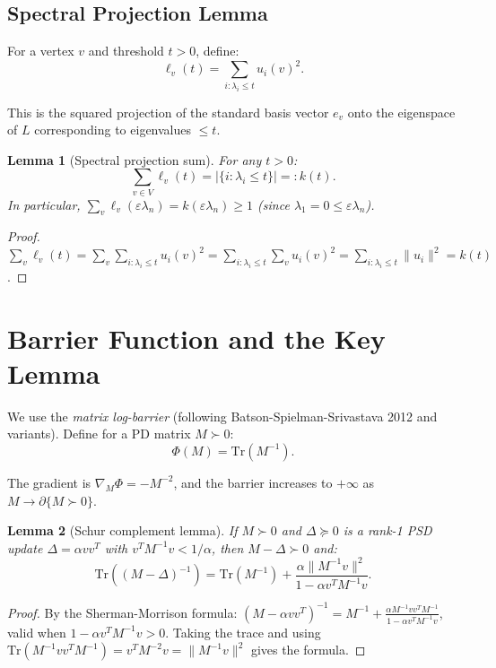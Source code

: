 \documentclass[12pt]{article}
\newtheorem{lemma}{Lemma}
\theoremstyle{definition}
\begin{document}
\subsection{Spectral Projection Lemma}

For a vertex $v$ and threshold $t > 0$, define:
$$\ell_v(t) = \sum_{i : \lambda_i \leq t} u_i(v)^2.$$

This is the squared projection of the standard basis vector $e_v$ onto the eigenspace of $L$ corresponding to eigenvalues $\leq t$.

\begin{lemma}[Spectral projection sum]\label{lem:spectral}
For any $t > 0$:
$$\sum_{v \in V} \ell_v(t) = |\{i : \lambda_i \leq t\}| =: k(t).$$
In particular, $\sum_v \ell_v(\varepsilon \lambda_n) = k(\varepsilon\lambda_n) \geq 1$ (since $\lambda_1 = 0 \leq \varepsilon\lambda_n$).
\end{lemma}

\begin{proof}
$\sum_v \ell_v(t) = \sum_v \sum_{i:\lambda_i\leq t} u_i(v)^2 = \sum_{i:\lambda_i\leq t}\sum_v u_i(v)^2 = \sum_{i:\lambda_i\leq t}\|u_i\|^2 = k(t)$.
\end{proof}

\section{Barrier Function and the Key Lemma}

We use the \emph{matrix log-barrier} (following Batson-Spielman-Srivastava 2012 and variants). Define for a PD matrix $M \succ 0$:
$$\Phi(M) = \mathrm{Tr}(M^{-1}).$$

The gradient is $\nabla_M \Phi = -M^{-2}$, and the barrier increases to $+\infty$ as $M \to \partial\{M \succ 0\}$.

\begin{lemma}[Schur complement lemma]\label{lem:schur}
If $M \succ 0$ and $\Delta \succeq 0$ is a rank-1 PSD update $\Delta = \alpha vv^T$ with $v^T M^{-1} v < 1/\alpha$, then $M - \Delta \succ 0$ and:
$$\mathrm{Tr}((M-\Delta)^{-1}) = \mathrm{Tr}(M^{-1}) + \frac{\alpha \|M^{-1}v\|^2}{1 - \alpha v^T M^{-1}v}.$$
\end{lemma}

\begin{proof}
By the Sherman-Morrison formula: $(M - \alpha vv^T)^{-1} = M^{-1} + \frac{\alpha M^{-1}vv^T M^{-1}}{1 - \alpha v^T M^{-1}v}$, valid when $1 - \alpha v^T M^{-1}v > 0$. Taking the trace and using $\mathrm{Tr}(M^{-1}vv^TM^{-1}) = v^TM^{-2}v = \|M^{-1}v\|^2$ gives the formula.
\end{proof}
\end{document}
